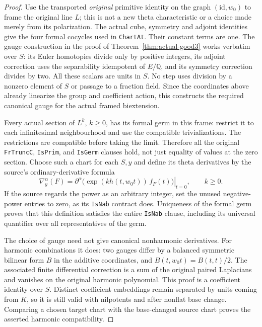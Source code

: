 \begin{proof}
Use the transported \emph{original} primitive identity on the graph
$(\mathrm{id},w_0)$ to frame the original line $L$; this is not a new
theta characteristic or a choice made merely from its polarization.
The actual cube, symmetry and adjoint identities give the four formal
cocycles used in \texttt{ChartAt}.  Their constant terms are one.
The gauge construction in the proof of Theorem~\ref{thm:actual-good3}
works verbatim over $S$: its Euler homotopies divide only by positive
integers, its adjoint correction uses the separability idempotent of
$E/\mathbb Q$, and its symmetry correction divides by two.  All these
scalars are units in $S$.  No step uses division by a nonzero element
of $S$ or passage to a fraction field.  Since the coordinates above
already linearize the group and coefficient action, this constructs
the required canonical gauge for the actual framed biextension.

Every actual section of $L^k$, $k\ge0$, has its formal germ in this
frame: restrict it to each infinitesimal neighbourhood and use the
compatible trivializations.  The restrictions are compatible before
taking the limit.  Therefore all the original \texttt{FrTruncC},
\texttt{IsPrim}, and \texttt{IsGerm} clauses hold, not just equality
of values at the zero section.  Choose such a chart for each $S,y$
and define its theta derivatives by the source's ordinary-derivative
formula
\[
     \nabla_y^\alpha(F)
       =\left.\partial^\alpha
          \bigl(\exp(kh(t,w_0t))\,f_F(t)\bigr)\right|_{t=0},
                    \qquad k\ge0.
\]
If the source regards the power as an arbitrary integer, set the
unused negative-power entries to zero, as its \texttt{IsNab} contract
does.  Uniqueness of the formal germ proves that this definition
satisfies the entire \texttt{IsNab} clause, including its universal
quantifier over all representatives of the germ.

The choice of gauge need not give canonical nonharmonic derivatives.
For harmonic combinations it does: two gauges differ by a balanced
symmetric bilinear form $B$ in the additive coordinates, and
$B(t,w_0t)=B(t,t)/2$.  The associated finite differential correction
is a sum of the original paired Laplacians and vanishes on the
original harmonic polynomial.  This proof is a coefficient identity
over $S$.  Distinct coefficient embeddings remain separated by units
coming from $K$, so it is still valid with nilpotents and after
nonflat base change.  Comparing a chosen target chart with the
base-changed source chart proves the asserted harmonic compatibility.


\end{proof}

